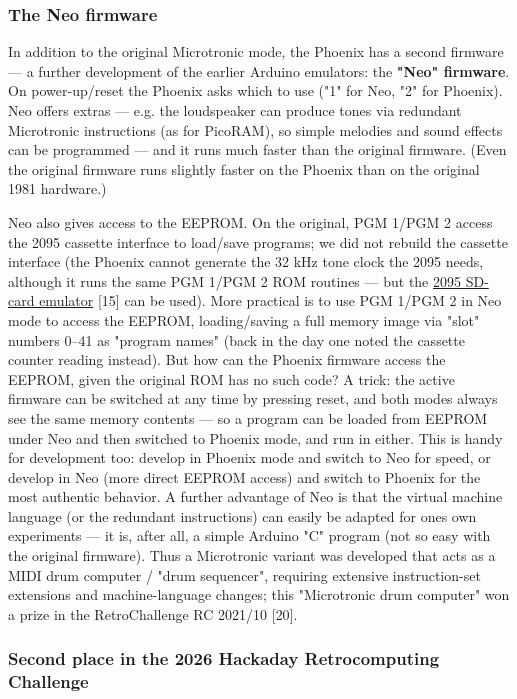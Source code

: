 \documentclass[
  11pt,
  letterpaper,
]{article}
\begin{document}
\subsubsection{The Neo firmware}\label{the-neo-firmware}

In addition to the original Microtronic mode, the Phoenix has a second
firmware --- a further development of the earlier Arduino emulators: the
\textbf{"Neo" firmware}. On power-up/reset the Phoenix asks which to use
("1" for Neo, "2" for Phoenix). Neo offers extras --- e.g. the
loudspeaker can produce tones via redundant Microtronic instructions (as
for PicoRAM), so simple melodies and sound effects can be programmed ---
and it runs much faster than the original firmware. (Even the original
firmware runs slightly faster on the Phoenix than on the original 1981
hardware.)

Neo also gives access to the EEPROM. On the original, PGM 1/PGM 2 access
the 2095 cassette interface to load/save programs; we did not rebuild
the cassette interface (the Phoenix cannot generate the 32 kHz tone
clock the 2095 needs, although it runs the same PGM 1/PGM 2 ROM routines
--- but the
\href{https://github.com/lambdamikel/microtronic-2095-arduino-emulator}{2095
SD-card emulator} {[}15{]} can be used). More practical is to use PGM
1/PGM 2 in Neo mode to access the EEPROM, loading/saving a full memory
image via "slot" numbers 0--41 as "program names" (back in the day one
noted the cassette counter reading instead). But how can the Phoenix
firmware access the EEPROM, given the original ROM has no such code? A
trick: the active firmware can be switched at any time by pressing
reset, and both modes always see the same memory contents --- so a
program can be loaded from EEPROM under Neo and then switched to Phoenix
mode, and run in either. This is handy for development too: develop in
Phoenix mode and switch to Neo for speed, or develop in Neo (more direct
EEPROM access) and switch to Phoenix for the most authentic behavior. A
further advantage of Neo is that the virtual machine language (or the
redundant instructions) can easily be adapted for one\textquotesingle s
own experiments --- it is, after all, a simple Arduino "C" program (not
so easy with the original firmware). Thus a Microtronic variant was
developed that acts as a MIDI drum computer / "drum sequencer",
requiring extensive instruction-set extensions and machine-language
changes; this "Microtronic drum computer" won a prize in the
RetroChallenge RC 2021/10 {[}20{]}.

\subsubsection{Second place in the 2026 Hackaday Retrocomputing
Challenge}\label{second-place-in-the-2026-hackaday-retrocomputing-challenge}
\end{document}
